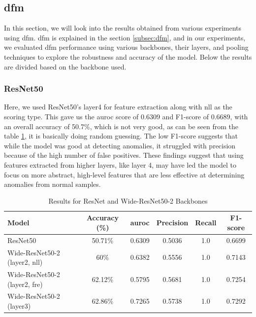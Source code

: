 
\subsection*{\gls{dfm}}

In this section, we will look into the results obtained from various experiments using \gls{dfm}. \gls{dfm} is explained in the section \ref{subsec:dfm}, and in our experiments, we evaluated \gls{dfm} performance using various backbones, their layers, and pooling techniques to explore the robustness and accuracy of the model. Below the results are divided based on the backbone used. 

\subsubsection*{ResNet50}

Here, we used ResNet50's layer4 for feature extraction along with \gls{nll} as the scoring type. This gave us the \gls{auroc} score of 0.6309 and F1-score of 0.6689, with an overall accuracy of 50.7\%, which is not very good, as can be seen from the table \ref{tab:dfm resnet results}, it is basically doing random guessing. The low F1-score suggests that while the model was good at detecting anomalies, it struggled with precision because of the high number of false positives. These findings suggest that using features extracted from higher layers, like layer 4, may have led the model to focus on more abstract, high-level features that are less effective at determining anomalies from normal samples.

\begin{table}[ht!]
    \centering
    \begin{tabular}{|l|c|c|c|c|c|}
        \hline
        \textbf{Model} & \textbf{Accuracy (\%)} & \textbf{\gls{auroc}} &\textbf{Precision} & \textbf{Recall} & \textbf{F1-score} \\ \hline
        ResNet50 & 50.71\% & 0.6309 & 0.5036 & 1.0 & 0.6699 \\ \hline
        Wide-ResNet50-2 (layer2, nll) & 60\% & 0.6382 & 0.5556 & 1.0 & 0.7143 \\ \hline
        Wide-ResNet50-2 (layer2, fre) & 62.12\% & 0.5795 & 0.5681 & 1.0 & 0.7254 \\ \hline
        Wide-ResNet50-2 (layer3) & 62.86\% & 0.7265 & 0.5738 & 1.0 & 0.7292 \\ \hline
    \end{tabular}
    \caption{Results for ResNet and Wide-ResNet50-2 Backbones}
    \label{tab:dfm resnet results}
\end{table}

